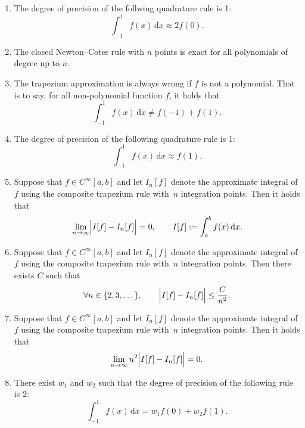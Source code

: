 \documentclass{article}
\renewcommand{\d}{\mathrm d}
\begin{document}
\begin{enumerate}

    \item
        The degree of precision of the follwing quadrature rule is 1:
        \[
            \int_{-1}^{1} f(x) \, \d x
            \approx 2 f(0).
        \]

    \item
        The closed Newton--Cotes rule with $n$ points is exact for all polynomials of degree up to $n$.

    \item
        The trapezium approximation is always wrong if $f$ is not a polynomial.
        That is to say, for all non-polynomial function $f$, it holds that
        \[
            \int_{-1}^1 f(x) \, \d x \neq f(-1) + f(1).
        \]

    \item
        The degree of precision of the following quadrature rule is 1:
        \[
            \int_{-1}^1 f(x) \, \d x \approx f(1).
        \]

    \item
        Suppose that $f \in C^{\infty}[a, b]$ and let $I_n[f]$ denote the approximate integral of $f$ using the composite trapezium rule
        with~$n$ integration points.
        Then it holds that
        \[
            \lim_{n \to \infty} \Bigl\lvert I[f] - I_n[f] \Bigr\rvert = 0, \qquad I[f] := \int_{a}^{b} f(x) \, \d x.
        \]

    \item
        Suppose that $f \in C^{\infty}[a, b]$ and let $I_n[f]$ denote the approximate integral of $f$ using the composite trapezium rule
        with~$n$ integration points.
        Then there exists $C$ such that
        \[
             \forall n \in \{2, 3, \dotsc \}, \qquad
             \Bigl\lvert I[f] - I_n[f] \Bigr\rvert \leq \frac{C}{n^2}.
        \]

    \item
        Suppose that $f \in C^{\infty}[a, b]$ and let $I_n[f]$ denote the approximate integral of $f$ using the composite trapezium rule
        with~$n$ integration points.
        Then it holds that
        \[
             \lim_{n \to \infty} n^2 \Bigl\lvert I[f] - I_n[f] \Bigr\rvert = 0.
        \]

    \item
        There exist $w_1$ and $w_2$ such that the degree of precision of the following rule is $2$:
        \[
            \int_{-1}^1 f(x) \, \d x = w_1 f(0) + w_2 f(1).
        \]


\end{enumerate}
\end{document}
